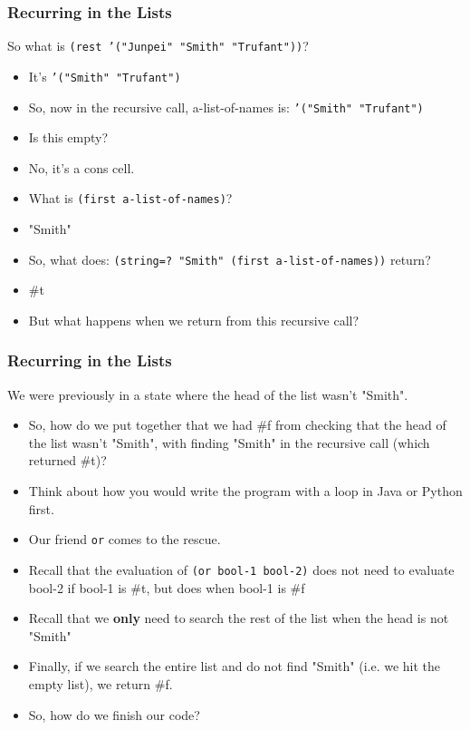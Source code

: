 \documentclass{beamer}
\begin{document}
\begin{frame}
  \frametitle{Recurring in the Lists}
  So what is \texttt{(rest '("Junpei" "Smith" "Trufant"))}?
  \begin{itemize}
  \item<2-> It's \texttt{'("Smith" "Trufant")}
  \item<3-> So, now in the recursive call, a-list-of-names is:
    \texttt{'("Smith" "Trufant")}
  \item<4-> Is this empty?
  \item<5-> No, it's a cons cell.
  \item<6-> What is \texttt{(first a-list-of-names)}?
  \item<7-> "Smith"
  \item<8-> So, what does: \texttt{(string=? "Smith" (first a-list-of-names))} return?
  \item<9-> \#t
  \item<10-> But what happens when we return from this recursive call?
  \end{itemize}
\end{frame}

\begin{frame}
  \frametitle{Recurring in the Lists}
  We were previously in a state where the head of the list wasn't "Smith".
  \begin{itemize}
  \item<2-> So, how do we put together that we had \#f from checking
    that the head of the list wasn't "Smith", with finding "Smith" in the recursive call (which returned \#t)?
  \item<3-> Think about how you would write the program
    with a loop in Java or Python first.
  \item<4-> Our friend \texttt{or} comes to the rescue.
  \item<5-> Recall that the evaluation of \texttt{(or bool-1 bool-2)}
    does not need to evaluate bool-2 if bool-1 is \#t, but does when bool-1 is \#f
  \item<6-> Recall that we \textbf{only} need to search the rest of the list
    when the head is not "Smith"
  \item<7-> Finally, if we search the entire list and do not find "Smith" (i.e. we hit the empty list), we return \#f.
  \item<8-> So, how do we finish our code?
  \end{itemize}
\end{frame}
\end{document}
